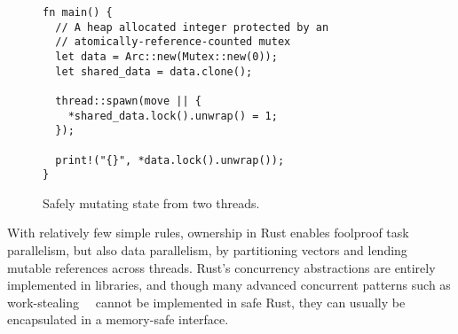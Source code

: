\begin{figure}
\begin{lstlisting}
fn main() {
  // A heap allocated integer protected by an
  // atomically-reference-counted mutex
  let data = Arc::new(Mutex::new(0));
  let shared_data = data.clone();

  thread::spawn(move || {
    *shared_data.lock().unwrap() = 1;
  });

  print!("{}", *data.lock().unwrap());
}
\end{lstlisting}
  \caption{Safely mutating state from two threads.}
  \label{fig:shared-mutable-concurrency}
\end{figure}

With relatively few simple rules, ownership in Rust enables foolproof task parallelism,
but also data parallelism, by partitioning vectors and lending mutable references across threads.
Rust's concurrency abstractions are entirely implemented in libraries, and though
many advanced concurrent patterns such as work-stealing~~\cite{blumeofe:multiprogrammed-work-stealing}
cannot be implemented in safe Rust, they can usually be encapsulated in a memory-safe interface.


